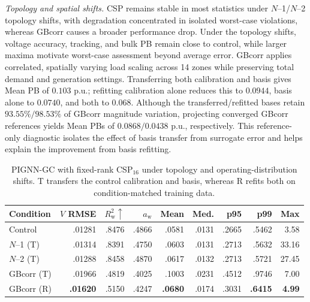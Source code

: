 \documentclass{article}
\begin{document}
\vspace{0.35em}

\noindent\textit{Topology and spatial shifts.}
CSP remains stable in most statistics under $N$--1/$N$--2 topology
shifts, with degradation concentrated in isolated worst-case violations,
whereas GBcorr causes a broader performance drop.
Under the topology shifts, voltage accuracy, tracking, and bulk PB remain
close to control, while larger maxima motivate worst-case assessment beyond
average error. GBcorr applies correlated, spatially
varying load scaling across 14 zones while preserving total demand and
generation settings. Transferring both calibration and basis gives Mean PB of
$0.103$ p.u.; refitting calibration alone reduces this to $0.0944$,
basis alone to $0.0740$, and both to $0.068$.
Although the transferred/refitted bases retain $93.55\%/98.53\%$ of GBcorr
magnitude variation, projecting converged GBcorr references yields Mean PBs
of $0.0868/0.0438$ p.u., respectively. This reference-only diagnostic
isolates the effect of basis transfer from surrogate error and helps explain
the improvement from basis refitting.

\begin{table}[t]
\centering
\caption{
PIGNN-GC with fixed-rank CSP$_{16}$ under topology and
operating-distribution shifts. T transfers the control calibration and basis,
whereas R refits both on condition-matched training data.
}
\label{tab:shift}
\setlength{\tabcolsep}{1.2pt}
\begin{tabular}{lrrrrrrrr}
\toprule
Condition &
\(V\) RMSE &
$R_{\mathrm{w}}^2 \uparrow$ &
$a_{\mathrm{w}}$ &
Mean &
Med. &
p95 &
p99 &
Max \\
\midrule
Control
& .01281
& .8476
& .4866
& .0581
& .0131
& .2665
& .5462
& 3.58 \\
\midrule
$N$--1 (T)
& .01314
& .8391
& .4750
& .0603
& .0131
& .2713
& .5632
& 33.16 \\
$N$--2 (T)
& .01288
& .8458
& .4870
& .0617
& .0132
& .2713
& .5721
& 27.45 \\
\midrule
GBcorr (T)
& .01966
& .4819
& .4025
& .1003
& .0231
& .4512
& .9746
& 7.00 \\
GBcorr (R)
& \textbf{.01620}
& .5150
& .4247
& \textbf{.0680}
& .0174
& .3031
& \textbf{.6415}
& \textbf{4.99} \\
\bottomrule
\end{tabular}

\end{table}
\end{document}

